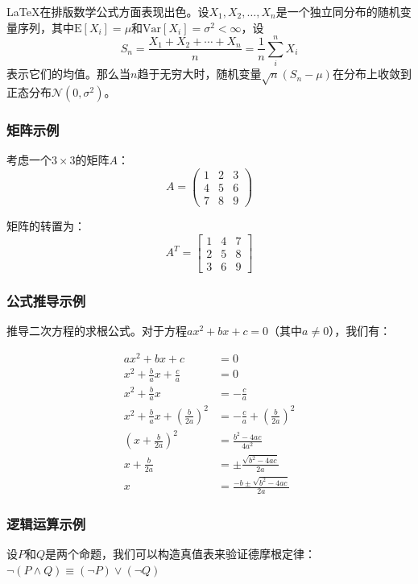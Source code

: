 \documentclass{article}
\begin{document}
\LaTeX{}在排版数学公式方面表现出色。设$X_1, X_2, \ldots, X_n$是一个独立同分布的随机变量序列，其中$\text{E}[X_i] = \mu$和$\text{Var}[X_i] = \sigma^2 < \infty$，设
\[S_n = \frac{X_1 + X_2 + \cdots + X_n}{n}
      = \frac{1}{n}\sum_{i}^{n} X_i\]
表示它们的均值。那么当$n$趋于无穷大时，随机变量$\sqrt{n}(S_n - \mu)$在分布上收敛到正态分布$\mathcal{N}(0, \sigma^2)$。

\subsubsection{矩阵示例}

考虑一个$3 \times 3$的矩阵$A$：
\[A = \begin{pmatrix}
1 & 2 & 3 \\
4 & 5 & 6 \\
7 & 8 & 9
\end{pmatrix}\]

矩阵的转置为：
\[A^T = \begin{bmatrix}
1 & 4 & 7 \\
2 & 5 & 8 \\
3 & 6 & 9
\end{bmatrix}\]

\subsubsection{公式推导示例}

推导二次方程的求根公式。对于方程$ax^2 + bx + c = 0$（其中$a \neq 0$），我们有：

\begin{align}
ax^2 + bx + c &= 0 \\
x^2 + \frac{b}{a}x + \frac{c}{a} &= 0 \\
x^2 + \frac{b}{a}x &= -\frac{c}{a} \\
x^2 + \frac{b}{a}x + \left(\frac{b}{2a}\right)^2 &= -\frac{c}{a} + \left(\frac{b}{2a}\right)^2 \\
\left(x + \frac{b}{2a}\right)^2 &= \frac{b^2 - 4ac}{4a^2} \\
x + \frac{b}{2a} &= \pm\frac{\sqrt{b^2 - 4ac}}{2a} \\
x &= \frac{-b \pm \sqrt{b^2 - 4ac}}{2a}
\end{align}

\subsubsection{逻辑运算示例}

设$P$和$Q$是两个命题，我们可以构造真值表来验证德摩根定律：$\neg(P \land Q) \equiv (\neg P) \lor (\neg Q)$
\end{document}
